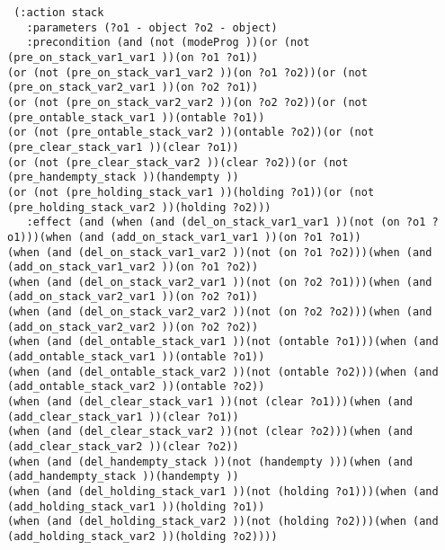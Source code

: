 \begin{scriptsize}
\begin{verbatim}
 (:action stack
   :parameters (?o1 - object ?o2 - object)
   :precondition (and (not (modeProg ))(or (not (pre_on_stack_var1_var1 ))(on ?o1 ?o1))
(or (not (pre_on_stack_var1_var2 ))(on ?o1 ?o2))(or (not (pre_on_stack_var2_var1 ))(on ?o2 ?o1))
(or (not (pre_on_stack_var2_var2 ))(on ?o2 ?o2))(or (not (pre_ontable_stack_var1 ))(ontable ?o1))
(or (not (pre_ontable_stack_var2 ))(ontable ?o2))(or (not (pre_clear_stack_var1 ))(clear ?o1))
(or (not (pre_clear_stack_var2 ))(clear ?o2))(or (not (pre_handempty_stack ))(handempty ))
(or (not (pre_holding_stack_var1 ))(holding ?o1))(or (not (pre_holding_stack_var2 ))(holding ?o2)))
   :effect (and (when (and (del_on_stack_var1_var1 ))(not (on ?o1 ?o1)))(when (and (add_on_stack_var1_var1 ))(on ?o1 ?o1))
(when (and (del_on_stack_var1_var2 ))(not (on ?o1 ?o2)))(when (and (add_on_stack_var1_var2 ))(on ?o1 ?o2))
(when (and (del_on_stack_var2_var1 ))(not (on ?o2 ?o1)))(when (and (add_on_stack_var2_var1 ))(on ?o2 ?o1))
(when (and (del_on_stack_var2_var2 ))(not (on ?o2 ?o2)))(when (and (add_on_stack_var2_var2 ))(on ?o2 ?o2))
(when (and (del_ontable_stack_var1 ))(not (ontable ?o1)))(when (and (add_ontable_stack_var1 ))(ontable ?o1))
(when (and (del_ontable_stack_var2 ))(not (ontable ?o2)))(when (and (add_ontable_stack_var2 ))(ontable ?o2))
(when (and (del_clear_stack_var1 ))(not (clear ?o1)))(when (and (add_clear_stack_var1 ))(clear ?o1))
(when (and (del_clear_stack_var2 ))(not (clear ?o2)))(when (and (add_clear_stack_var2 ))(clear ?o2))
(when (and (del_handempty_stack ))(not (handempty )))(when (and (add_handempty_stack ))(handempty ))
(when (and (del_holding_stack_var1 ))(not (holding ?o1)))(when (and (add_holding_stack_var1 ))(holding ?o1))
(when (and (del_holding_stack_var2 ))(not (holding ?o2)))(when (and (add_holding_stack_var2 ))(holding ?o2))))


\end{verbatim}
\end{scriptsize}
